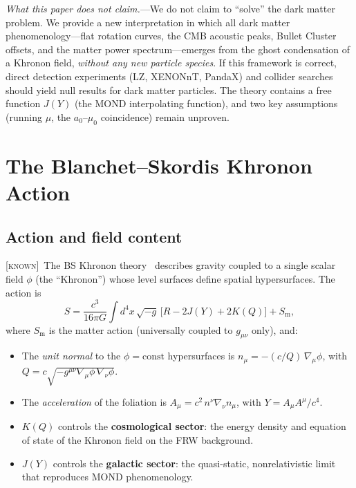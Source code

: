 \documentclass[prd,twocolumn,superscriptaddress,longbibliography,floatfix]{revtex4-2}
\newcommand{\known}{\textsc{[known]}}
\begin{document}
\emph{What this paper does not claim.}---We do not claim to
``solve'' the dark matter problem.  We provide a new interpretation
in which all dark matter phenomenology---flat rotation curves,
the CMB acoustic peaks, Bullet Cluster offsets, and the
matter power spectrum---emerges from the ghost condensation of
a Khronon field, \emph{without any new particle species}.
If this framework is correct, direct detection experiments
(LZ, XENONnT, PandaX) and collider searches should yield null
results for dark matter particles.
The theory contains a free function $J(Y)$ (the MOND interpolating
function), and two key assumptions (running $\mu$, the
$a_0$--$\mu_0$ coincidence) remain unproven.


\section{The Blanchet--Skordis Khronon Action}
\label{sec:action}

\subsection{Action and field content}

\known\  The BS Khronon theory~\cite{BS2024,BS2025} describes
gravity coupled to a single scalar field $\phi$ (the ``Khronon'')
whose level surfaces define spatial hypersurfaces.  The action is
\begin{equation}
S = \frac{c^3}{16\pi G}\int\!d^4x\,\sqrt{-g}\,
\big[R - 2J(Y) + 2K(Q)\big] + S_{\mathrm{m}},
\label{eq:action}
\end{equation}
where $S_{\mathrm{m}}$ is the matter action (universally coupled
to $g_{\mu\nu}$ only), and:
\begin{itemize}
\item The \emph{unit normal} to the $\phi = \mathrm{const}$
  hypersurfaces is
  $n_\mu = -(c/Q)\,\nabla_\mu\phi$, with
  $Q = c\sqrt{-g^{\mu\nu}\nabla_\mu\phi\,\nabla_\nu\phi}$.
\item The \emph{acceleration} of the foliation is
  $A_\mu = c^2\,n^\nu\nabla_\nu n_\mu$, with
  $Y = A_\mu A^\mu / c^4$.
\item $K(Q)$ controls the \textbf{cosmological sector}:
  the energy density and equation of state of the Khronon field
  on the FRW background.
\item $J(Y)$ controls the \textbf{galactic sector}:
  the quasi-static, nonrelativistic limit that reproduces
  MOND phenomenology.
\end{itemize}
\end{document}
